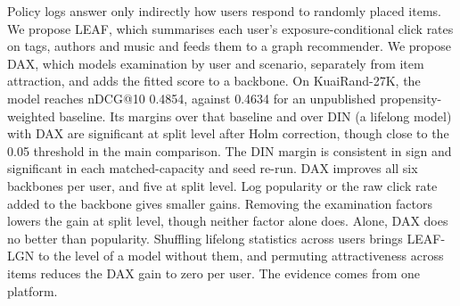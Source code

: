 Policy logs answer only indirectly how users respond to randomly placed items. We propose LEAF, which summarises each user's exposure-conditional click rates on tags, authors and music and feeds them to a graph recommender. We propose DAX, which models examination by user and scenario, separately from item attraction, and adds the fitted score to a backbone. On KuaiRand-27K, the model reaches nDCG@10 0.4854, against 0.4634 for an unpublished propensity-weighted baseline. Its margins over that baseline and over DIN (a lifelong model) with DAX are significant at split level after Holm correction, though close to the 0.05 threshold in the main comparison. The DIN margin is consistent in sign and significant in each matched-capacity and seed re-run. DAX improves all six backbones per user, and five at split level. Log popularity or the raw click rate added to the backbone gives smaller gains. Removing the examination factors lowers the gain at split level, though neither factor alone does. Alone, DAX does no better than popularity. Shuffling lifelong statistics across users brings LEAF-LGN to the level of a model without them, and permuting attractiveness across items reduces the DAX gain to zero per user. The evidence comes from one platform.
